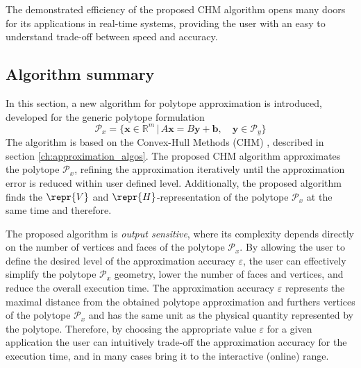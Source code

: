 The demonstrated efficiency of the proposed CHM algorithm opens many doors for its applications in real-time systems, providing the user with an easy to understand trade-off between speed and accuracy.

\subsection{Algorithm summary}

In this section, a new algorithm for polytope approximation is introduced, developed for the generic polytope formulation
\begin{equation}
    \mathcal{P}_x = \big\{ \bm{x}\in \mathbb{R}^{m}\, |\,A\bm{x} = B\bm{y} + \bm{b}, \quad  \bm{y}\in\mathcal{P}_y  \big\}
    \label{eq:generic_polyt_view_revisit3}
\end{equation}
The algorithm is based on the Convex-Hull Methods (CHM) \cite{lassez1992quantifier}, described in section \ref{ch:approximation_algos}. The proposed CHM algorithm approximates the polytope $\mathcal{P}_x$, refining the approximation iteratively until the approximation error is reduced within user defined level. 
Additionally, the proposed algorithm finds the $\repr{V}$ and $\repr{H}$-representation of the polytope $\mathcal{P}_x$ at the same time and therefore.

The proposed algorithm is \textit{output sensitive}, where its complexity depends directly on the number of vertices and faces of the polytope  $\mathcal{P}_x$. By allowing the user to define the desired level of the approximation accuracy $\varepsilon$, the user can effectively simplify the polytope $\mathcal{P}_x$ geometry, lower the number of faces and vertices, and reduce the overall execution time. 
The approximation accuracy $\varepsilon$ represents the maximal distance from the obtained polytope approximation and furthers vertices of the polytope $\mathcal{P}_x$ and has the same unit as the physical quantity represented by the polytope. 
Therefore, by choosing the appropriate value $\varepsilon$ for a given application the user can intuitively trade-off the approximation accuracy for the execution time, and in many cases bring it to the interactive (online) range. 

